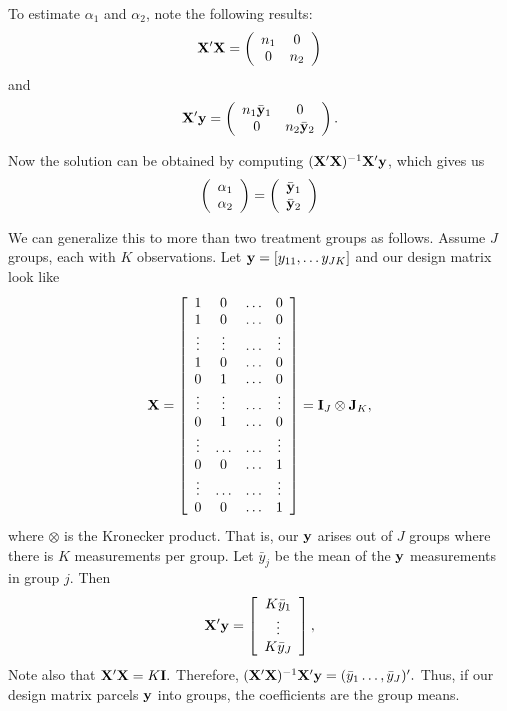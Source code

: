 To estimate $\alpha_1$ and $\alpha_2$, note the following results:
\begin{eqnarray*}
\mathbf{X}' \mathbf{X} = 
\left( \begin{array}{cc}
 n_1   &   0  \\ 
 0   &   n_2  
\end{array} \right)
\end{eqnarray*}
and
\begin{eqnarray*}
\mathbf{X}' \mathbf{y} = 
\left( \begin{array}{cc}
 n_1 {\bar {\mathbf{y}}_1}   &   0  \\ 
 0   &   n_2 {\bar {\mathbf{y}}_2}  
\end{array} \right).
\end{eqnarray*}

Now the solution can be obtained by computing $(\mathbf{X}' \mathbf{X})^{-1} \mathbf{X}' \mathbf{y}$, which gives us
$$
\left( \begin{array}{c} \alpha_1 \\ \alpha_2 \end{array} \right) = \left( \begin{array}{c} \bar {\mathbf{y}}_1 \\ \bar {\mathbf{y}}_2 \end{array} \right)
$$


\bigskip
We can generalize this to more than two treatment groups as follows.
Assume $J$ groups, each with $K$ observations. Let $\mathbf{y} = [y_{11}, \ldots y_{JK}]$ and our design matrix look like
$$
\mathbf{X} =
\left[
\begin{array}{cccc}
1 & 0  & \ldots & 0 \\
1 & 0  & \ldots & 0 \\
\vdots & \vdots & \ldots  & \vdots \\
1 & 0 & \ldots & 0 \\
0  & 1 & \ldots & 0 \\
\vdots & \vdots & \ldots  & \vdots \\
0  & 1 & \ldots & 0 \\
\vdots & \ldots & \ldots  & \vdots \\
0  & 0 & \ldots & 1 \\
\vdots & \ldots & \ldots  & \vdots \\
0  & 0 & \ldots & 1 \\
\end{array}
\right] = \mathbf{I}_J \otimes \mathbf{J}_K,
$$
where $\otimes$ is the Kronecker product. 
That is, our $\mathbf{y}$ arises out of $J$ groups
where there is $K$ measurements per group. Let
$\bar y_j$ be the mean of the $\mathbf{y}$ measurements
in group $j$. 
Then 
$$
\mathbf{X}' \mathbf{y} = 
\left[
\begin{array}{c}
K \bar y_1 \\
\vdots \\
K \bar y_J
\end{array}
\right] ,
$$
Note also that 
$\mathbf{X}' \mathbf{X} = K \mathbf{I}.$ Therefore, $(\mathbf{X}' \mathbf{X})^{-1} \mathbf{X}' \mathbf{y} =
(\bar y_1 \ldots, \bar y_J)'.$ Thus, if 
our design matrix parcels $\mathbf{y}$ into groups,
the coefficients are the group means.

